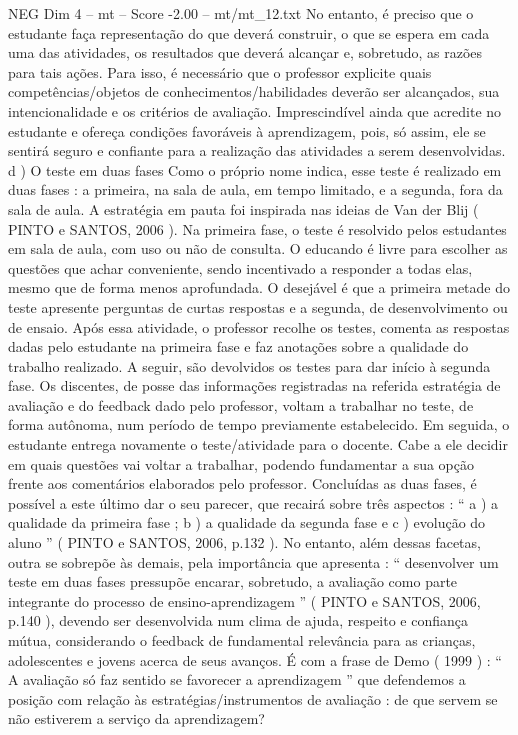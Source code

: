 \begin{textsample}{NEG Dim 4 – mt – Score -2.00 – mt/mt\_12.txt}
No entanto, é preciso que o estudante faça representação do que deverá construir, o que se espera em cada uma das atividades, os resultados que deverá alcançar e, sobretudo, as razões para tais ações.
Para isso, é necessário que o professor explicite quais competências/objetos de conhecimentos/habilidades deverão ser alcançados, sua intencionalidade e os critérios de avaliação.
Imprescindível ainda que acredite no estudante e ofereça condições favoráveis à aprendizagem, pois, só assim, ele se sentirá seguro e confiante para a realização das atividades a serem desenvolvidas. d ) O teste em duas fases Como o próprio nome indica, esse teste é realizado em duas fases : a primeira, na sala de aula, em tempo limitado, e a segunda, fora da sala de aula.
A estratégia em pauta foi inspirada nas ideias de Van der Blij ( PINTO e SANTOS, 2006 ).
Na primeira fase, o teste é resolvido pelos estudantes em sala de aula, com uso ou não de consulta.
O educando é livre para escolher as questões que achar conveniente, sendo incentivado a responder a todas elas, mesmo que de forma menos aprofundada.
O desejável é que a primeira metade do teste apresente perguntas de curtas respostas e a segunda, de desenvolvimento ou de ensaio.
Após essa atividade, o professor recolhe os testes, comenta as respostas dadas pelo estudante na primeira fase e faz anotações sobre a qualidade do trabalho realizado.
A seguir, são devolvidos os testes para dar início à segunda fase.
Os discentes, de posse das informações registradas na referida estratégia de avaliação e do feedback dado pelo professor, voltam a trabalhar no teste, de forma autônoma, num período de tempo previamente estabelecido.
Em seguida, o estudante entrega novamente o teste/atividade para o docente.
Cabe a ele decidir em quais questões vai voltar a trabalhar, podendo fundamentar a sua opção frente aos comentários elaborados pelo professor.
Concluídas as duas fases, é possível a este último dar o seu parecer, que recairá sobre três aspectos : “ a ) a qualidade da primeira fase ; b ) a qualidade da segunda fase e c ) evolução do aluno ” ( PINTO e SANTOS, 2006, p.132 ).
No entanto, além dessas facetas, outra se sobrepõe às demais, pela importância que apresenta : “ desenvolver um teste em duas fases pressupõe encarar, sobretudo, a avaliação como parte integrante do processo de ensino-aprendizagem ” ( PINTO e SANTOS, 2006, p.140 ), devendo ser desenvolvida num clima de ajuda, respeito e confiança mútua, considerando o feedback de fundamental relevância para as crianças, adolescentes e jovens acerca de seus avanços.
É com a frase de Demo ( 1999 ) : “ A avaliação só faz sentido se favorecer a aprendizagem ” que defendemos a posição com relação às estratégias/instrumentos de avaliação : de que servem se não estiverem a serviço da aprendizagem?

\end{textsample}
